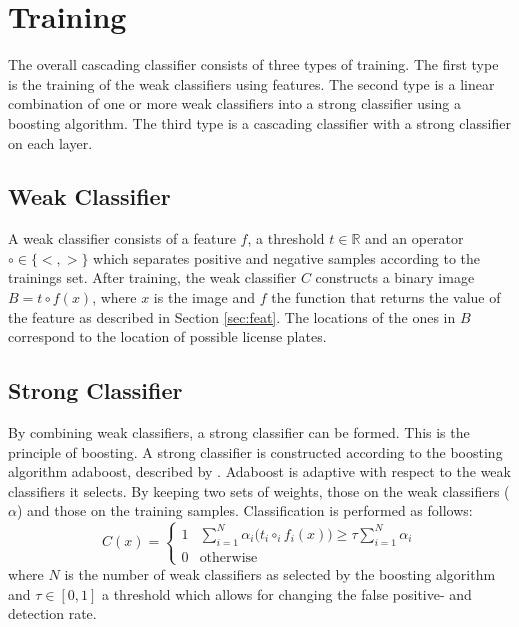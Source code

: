 \documentclass[a4paper,11pt]{article}
\begin{document}


\section{Training} \label{sec:train}
The overall cascading classifier consists of three types of training. The first
type is the training of the weak classifiers using features. The second type is
a linear combination of one or more weak classifiers into a strong classifier
using a boosting algorithm. The third type is a cascading classifier
with a strong classifier on each layer.

\subsection{Weak Classifier} \label{sec:weak}
A weak classifier consists of a feature $f$, a threshold $t \in \mathbb{R}$ and
an operator $\circ \in \{<, >\}$ which separates positive and negative samples
according to the trainings set. After training, the weak classifier $C$
constructs a binary image $B = t \circ f(x)$, where $x$ is the image and $f$
the function that returns the value of the feature as described in Section
\ref{sec:feat}. The locations of the ones in $B$ correspond to the location of
possible license plates.

\subsection{Strong Classifier} \label{sec:strong}
By combining weak classifiers, a strong classifier can be formed. This is the
principle of boosting.  A strong classifier is constructed according to the
boosting algorithm adaboost, described by \cite{viola}. Adaboost is adaptive
with respect to the weak classifiers it selects. By keeping two sets of
weights, those on the weak classifiers ($\alpha$) and those on the training
samples. Classification is performed as follows:
\begin{displaymath}
C(x) = 
	\left\{ \begin{array}{ll}
		1 & \sum^N_{i=1} \alpha_i \big(t_i \circ_i f_i(x)\big) \ge \tau \sum^N_{i=1}\alpha_i \\
		0 & \textrm{otherwise}
	\end{array} \right.
\end{displaymath}
where $N$ is the number of weak classifiers as selected by the boosting
algorithm and $\tau \in [0,1]$ a threshold which allows for changing the false
positive- and detection rate.
\end{document}
